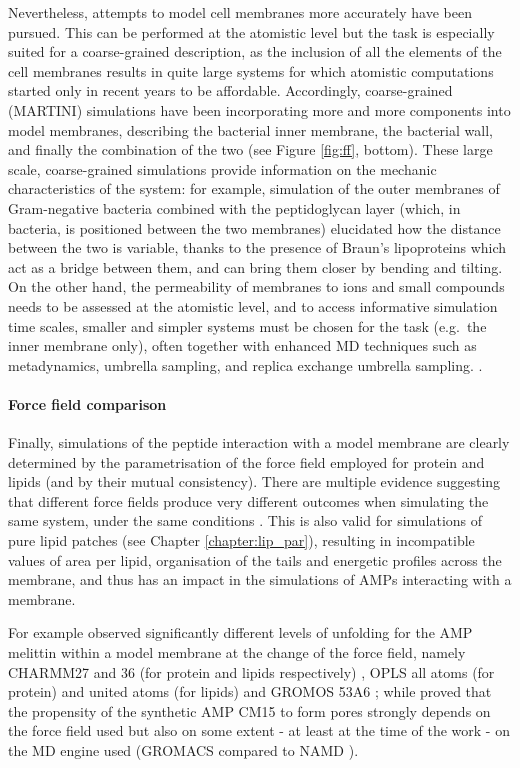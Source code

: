 Nevertheless, attempts to model cell membranes more accurately have been pursued. This can be performed at the atomistic level \citep{Piggot2011}
but the task is especially suited for a coarse-grained description, as the inclusion of all the elements of the cell membranes results in quite large systems for which atomistic computations started only in recent years to be affordable.
%
Accordingly, coarse-grained (MARTINI) simulations have been incorporating more and more components into model membranes, describing the bacterial inner membrane, the bacterial wall, and finally the combination of the two \citep{Khalid2019} (see Figure \ref{fig:ff}, bottom).
%
These large scale, coarse-grained simulations provide information on the mechanic characteristics of the system: for example, simulation of the outer membranes of Gram-negative bacteria combined with the peptidoglycan layer (which, in bacteria, is positioned between the two membranes) elucidated how the distance between the two is variable, thanks to the presence of Braun's lipoproteins \citep{Asmar2018} which act as a bridge between them, and can bring them closer by bending and tilting.
%
On the other hand, the permeability of membranes to ions and small compounds needs to be assessed at the atomistic level, and to access informative simulation time scales, smaller and simpler systems must be chosen for the task (e.g.\ the inner membrane only), often together with enhanced MD techniques such as metadynamics, umbrella sampling, and replica exchange umbrella sampling. \citep{Sun2016,Piggot2011,Carpenter2016,Pokhrel2018}.

\paragraph{Force field comparison} Finally, simulations of the peptide interaction with a model membrane are clearly determined by the parametrisation of the force field employed for protein and lipids (and by their mutual consistency).
%
There are multiple evidence suggesting that different force fields produce very different outcomes when simulating the same system, under the same conditions \citep{Wang2014,Bennett2016,Sandoval-Perez2017}. This is also valid for simulations of pure lipid patches (see Chapter \ref{chapter:lip_par}), resulting in incompatible values of area per lipid, organisation of the tails and energetic profiles across the membrane, and thus has an impact in the simulations of AMPs interacting with a membrane.

For example \citet{Wang2014} observed significantly different levels of unfolding for the AMP melittin within a model membrane at the change of the force field, namely CHARMM27 and 36 (for protein and lipids respectively) \citep{MacKerell1998,Klauda2010}, OPLS all atoms (for protein) and united atoms (for lipids) \citep{Jorgensen1996} and GROMOS 53A6 \citep{Oostenbrink2004}; while \citet{Bennett2016} proved that the propensity of the synthetic AMP CM15 to form pores strongly depends on the force field used but also on some extent - at least at the time of the work - on the MD engine used (GROMACS compared to NAMD \citep{Phillips2005}).

